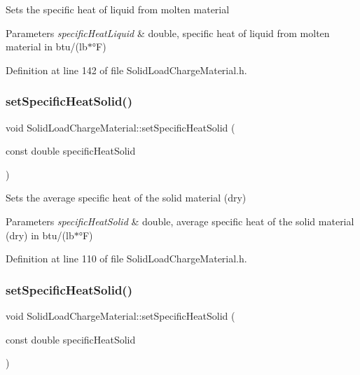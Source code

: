 Sets the specific heat of liquid from molten material 
\begin{DoxyParams}{Parameters}
{\em specific\+Heat\+Liquid} & double, specific heat of liquid from molten material in btu/(lb$\ast$°F) \\
\hline
\end{DoxyParams}


Definition at line 142 of file Solid\+Load\+Charge\+Material.\+h.

\mbox{\label{class_solid_load_charge_material_ad9d2e3668a6a14700f4dced4882f98c0}} 
\subsubsection{\texorpdfstring{set\+Specific\+Heat\+Solid()}{setSpecificHeatSolid()}\hspace{0.1cm}{\footnotesize\ttfamily [1/3]}}
{\footnotesize\ttfamily void Solid\+Load\+Charge\+Material\+::set\+Specific\+Heat\+Solid (\begin{DoxyParamCaption}\item[{const double}]{specific\+Heat\+Solid }\end{DoxyParamCaption})\hspace{0.3cm}{\ttfamily [inline]}}

Sets the average specific heat of the solid material (dry) 
\begin{DoxyParams}{Parameters}
{\em specific\+Heat\+Solid} & double, average specific heat of the solid material (dry) in btu/(lb$\ast$°F) \\
\hline
\end{DoxyParams}


Definition at line 110 of file Solid\+Load\+Charge\+Material.\+h.

\mbox{\label{class_solid_load_charge_material_ad9d2e3668a6a14700f4dced4882f98c0}} 
\subsubsection{\texorpdfstring{set\+Specific\+Heat\+Solid()}{setSpecificHeatSolid()}\hspace{0.1cm}{\footnotesize\ttfamily [2/3]}}
{\footnotesize\ttfamily void Solid\+Load\+Charge\+Material\+::set\+Specific\+Heat\+Solid (\begin{DoxyParamCaption}\item[{const double}]{specific\+Heat\+Solid }\end{DoxyParamCaption})\hspace{0.3cm}{\ttfamily [inline]}}

